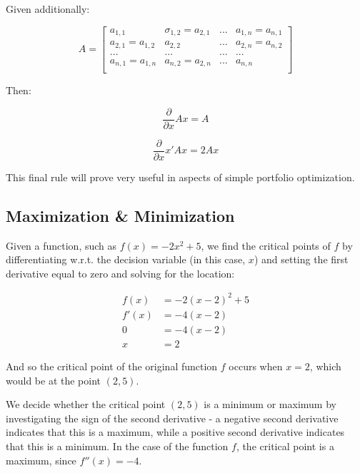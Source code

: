 \documentclass[]{book}
\theoremstyle{definition}
\theoremstyle{definition}
\theoremstyle{definition}
\theoremstyle{remark}
\begin{document}
Given additionally:

\[
A = \begin{bmatrix} a_{1,1} & \sigma_{1,2} = a_{2,1} & ... & a_{1,n} = a_{n,1} \\
                         a_{2,1} = a_{1,2} & a_{2,2} & ... & a_{2,n} = a_{n,2} \\
                         ... & ... & ... & ... \\
                         a_{n,1} = a_{1,n} & a_{n,2} = a_{2,n} & ... & a_{n,n} \\
                         \end{bmatrix}
\]

Then:

\begin{equation}
\label{vec_calc2}
\frac{\partial}{\partial x} Ax = A 
\end{equation}

\begin{equation}
\label{vec_calc3}
\frac{\partial}{\partial x} x' A x = 2Ax
\end{equation}

This final rule will prove very useful in aspects of simple portfolio
optimization.

\subsection*{Maximization \&
Minimization}\label{maximization-minimization}

Given a function, such as \(f(x) = -2x^2 + 5\), we find the critical
points of \(f\) by differentiating w.r.t. the decision variable (in this
case, \(x\)) and setting the first derivative equal to zero and solving
for the location:

\begin{align*}
f(x) &= -2(x-2)^2 + 5\\
f'(x) &= -4(x-2)\\
0 &= -4(x-2)\\
x &= 2
\end{align*}

And so the critical point of the original function \(f\) occurs when
\(x=2\), which would be at the point \((2,5)\).

We decide whether the critical point \((2,5)\) is a minimum or maximum
by investigating the sign of the second derivative - a negative second
derivative indicates that this is a maximum, while a positive second
derivative indicates that this is a minimum. In the case of the function
\(f\), the critical point is a maximum, since \(f''(x) = -4\).
\end{document}
